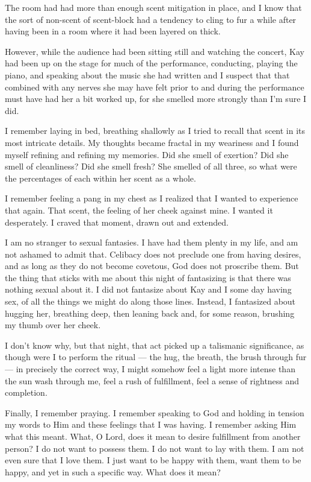 The room had had more than enough scent mitigation in place, and I know that the sort of non-scent of scent-block had a tendency to cling to fur a while after having been in a room where it had been layered on thick.

However, while the audience had been sitting still and watching the concert, Kay had been up on the stage for much of the performance, conducting, playing the piano, and speaking about the music she had written and I suspect that that combined with any nerves she may have felt prior to and during the performance must have had her a bit worked up, for she smelled more strongly than I'm sure I did.

I remember laying in bed, breathing shallowly as I tried to recall that scent in its most intricate details. My thoughts became fractal in my weariness and I found myself refining and refining my memories. Did she smell of exertion? Did she smell of cleanliness? Did she smell fresh? She smelled of all three, so what were the percentages of each within her scent as a whole.

I remember feeling a pang in my chest as I realized that I wanted to experience that again. That scent, the feeling of her cheek against mine. I wanted it desperately. I craved that moment, drawn out and extended.

I am no stranger to sexual fantasies. I have had them plenty in my life, and am not ashamed to admit that. Celibacy does not preclude one from having desires, and as long as they do not become covetous, God does not proscribe them. But the thing that sticks with me about this night of fantasizing is that there was nothing sexual about it. I did not fantasize about Kay and I some day having sex, of all the things we might do along those lines. Instead, I fantasized about hugging her, breathing deep, then leaning back and, for some reason, brushing my thumb over her cheek.

I don't know why, but that night, that act picked up a talismanic significance, as though were I to perform the ritual --- the hug, the breath, the brush through fur --- in precisely the correct way, I might somehow feel a light more intense than the sun wash through me, feel a rush of fulfillment, feel a sense of rightness and completion.

Finally, I remember praying. I remember speaking to God and holding in tension my words to Him and these feelings that I was having. I remember asking Him what this meant. What, O Lord, does it mean to desire fulfillment from another person? I do not want to possess them. I do not want to lay with them. I am not even sure that I love them. I just want to be happy with them, want them to be happy, and yet in such a specific way. What does it mean?

